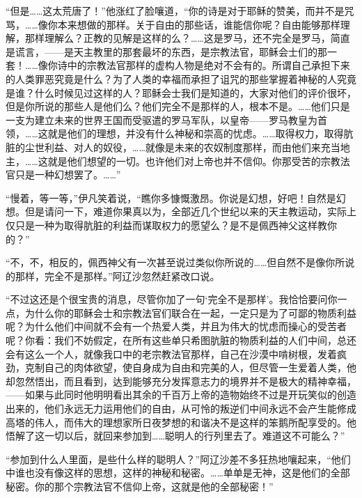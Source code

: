 \par “但是……这太荒唐了！”他涨红了脸嚷道，“你的诗是对于耶稣的赞美，而并不是咒骂，……像你本来想做的那样。关于自由的那些话，谁能信你呢？自由能够那样理解，那样理解么？正教的见解是这样的么？……这是罗马，还不完全是罗马，简直是谎言，——是天主教里的那套最坏的东西，是宗教法官，耶稣会士们的那一套！……像你诗中的宗教法官那样的虚构人物是绝对不会有的。所谓自己承担下来的人类罪恶究竟是什么？为了人类的幸福而承担了诅咒的那些掌握着神秘的人究竟是谁？什么时候见过这样的人？耶稣会士我们是知道的，大家对他们的评价很坏，但是你所说的那些人是他们么？他们完全不是那样的人，根本不是。……他们只是一支为建立未来的世界王国而受驱遣的罗马军队，以皇帝——罗马教皇为首领，……这就是他们的理想，并没有什么神秘和崇高的忧虑。……取得权力，取得肮脏的尘世利益、对人的奴役，……就像是未来的农奴制度那样，而由他们来充当地主，……这就是他们想望的一切。也许他们对上帝也并不信仰。你那受苦的宗教法官只是一种幻想罢了。……”
\par “慢着，等一等，”伊凡笑着说，“瞧你多慷慨激昂。你说是幻想，好吧！自然是幻想。但是请问一下，难道你果真以为，全部近几个世纪以来的天主教运动，实际上仅只是一种为取得肮脏的利益而谋取权力的愿望么？是不是佩西神父这样教你的？”
\par “不，不，相反的，佩西神父有一次甚至说过类似你所说的……但自然不是像你所说的那样，完全不是那样。”阿辽沙忽然赶紧改口说。
\par “不过这还是个很宝贵的消息，尽管你加了一句‘完全不是那样’。我恰恰要问你一点，为什么你的耶稣会士和宗教法官们联合在一起，一定只是为了可鄙的物质利益呢？为什么他们中间就不会有一个热爱人类，并且为伟大的忧虑而操心的受苦者呢？你看：我们不妨假定，在所有这些单只希图肮脏的物质利益的人们中间，总还会有这么一个人，就像我口中的老宗教法官那样，自己在沙漠中啃树根，发着疯劲，克制自己的肉体欲望，使自身成为自由和完美的人，但尽管一生爱着人类，他却忽然悟出，而且看到，达到能够充分发挥意志力的境界并不是极大的精神幸福，——如果与此同时他明明看出其余的千百万上帝的造物始终不过是开玩笑似的创造出来的，他们永远无力运用他们的自由，从可怜的叛逆们中间永远不会产生能修成高塔的伟人，而伟大的理想家所日夜梦想的和谐决不是这样的笨鹅所配享受的。他悟解了这一切以后，就回来参加到……聪明人的行列里去了。难道这不可能么？”
\par “参加到什么人里面，是些什么样的聪明人？”阿辽沙差不多狂热地嚷起来，“他们中谁也没有像这样的思想，这样的神秘和秘密。……单单是无神，这是他们的全部秘密。你的那个宗教法官不信仰上帝，这就是他的全部秘密！”
